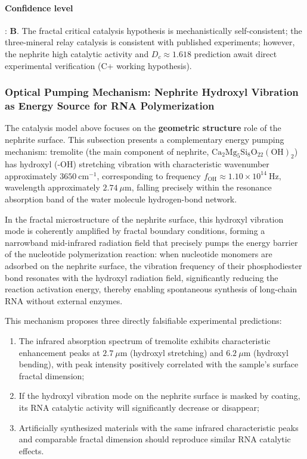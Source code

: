 \documentclass[12pt,a4paper,twocolumn]{article}
\begin{document}
\paragraph{Confidence level}: \textbf{B}. The fractal critical catalysis hypothesis is mechanistically self-consistent; the three-mineral relay catalysis is consistent with published experiments; however, the nephrite high catalytic activity and $D_c\approx1.618$ prediction await direct experimental verification (C+ working hypothesis).

\subsubsection{Optical Pumping Mechanism: Nephrite Hydroxyl Vibration as Energy Source for RNA Polymerization}
\label{subsec:jade_pump_mechanism}
The catalysis model above focuses on the \textbf{geometric structure} role of the nephrite surface. This subsection presents a complementary energy pumping mechanism: tremolite (the main component of nephrite, $\text{Ca}_2\text{Mg}_5\text{Si}_8\text{O}_{22}(\text{OH})_2$) has hydroxyl (-OH) stretching vibration with characteristic wavenumber approximately $3650\ \text{cm}^{-1}$, corresponding to frequency $f_{\text{OH}} \approx 1.10 \times 10^{14}\ \text{Hz}$, wavelength approximately $2.74\ \mu\text{m}$, falling precisely within the resonance absorption band of the water molecule hydrogen-bond network.

In the fractal microstructure of the nephrite surface, this hydroxyl vibration mode is coherently amplified by fractal boundary conditions, forming a narrowband mid-infrared radiation field that precisely pumps the energy barrier of the nucleotide polymerization reaction: when nucleotide monomers are adsorbed on the nephrite surface, the vibration frequency of their phosphodiester bond resonates with the hydroxyl radiation field, significantly reducing the reaction activation energy, thereby enabling spontaneous synthesis of long-chain RNA without external enzymes.

This mechanism proposes three directly falsifiable experimental predictions:
\begin{enumerate}
\item The infrared absorption spectrum of tremolite exhibits characteristic enhancement peaks at $2.7\ \mu\text{m}$ (hydroxyl stretching) and $6.2\ \mu\text{m}$ (hydroxyl bending), with peak intensity positively correlated with the sample's surface fractal dimension;
\item If the hydroxyl vibration mode on the nephrite surface is masked by coating, its RNA catalytic activity will significantly decrease or disappear;
\item Artificially synthesized materials with the same infrared characteristic peaks and comparable fractal dimension should reproduce similar RNA catalytic effects.
\end{enumerate}
\end{document}
